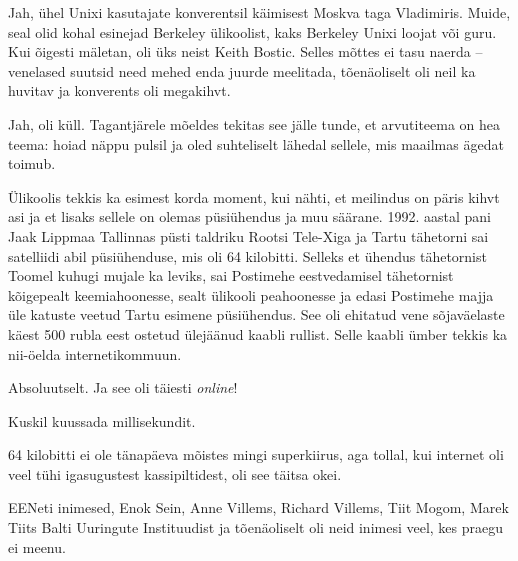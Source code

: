 
Jah, ühel Unixi kasutajate konverentsil käimisest Moskva taga Vladimiris. Muide, seal olid kohal esinejad Berkeley ülikoolist, 
kaks Berkeley Unixi loojat või guru. Kui õigesti mäletan, oli üks neist 
Keith Bostic. Selles mõttes ei tasu naerda -- venelased suutsid need mehed 
enda juurde meelitada, tõenäoliselt oli neil ka huvitav ja konverents oli 
megakihvt.


Jah, oli küll. Tagantjärele mõeldes tekitas see jälle tunde, et arvutiteema on hea 
teema: hoiad näppu pulsil ja oled suhteliselt lähedal sellele, mis 
maailmas ägedat toimub.

Ülikoolis tekkis ka esimest korda moment, kui nähti, et meilindus on päris 
kihvt asi ja et lisaks sellele on olemas püsiühendus ja muu säärane. 1992. 
aastal pani Jaak Lippmaa 
Tallinnas püsti taldriku Rootsi Tele-Xiga ja Tartu tähetorni sai satelliidi abil püsiühenduse, mis oli 64 kilobitti. Selleks et 
ühendus tähetornist Toomel kuhugi mujale ka leviks, sai Postimehe 
eestvedamisel tähetornist kõigepealt keemiahoonesse, sealt ülikooli peahoonesse ja edasi Postimehe majja 
üle katuste veetud Tartu esimene püsiühendus. See oli ehitatud vene 
sõjaväelaste käest 500 rubla eest ostetud ülejäänud kaabli rullist.
Selle kaabli ümber tekkis ka nii-öelda internetikommuun. 


Absoluutselt. Ja see oli täiesti \emph{online}!


Kuskil kuussada millisekundit.


64 kilobitti ei ole tänapäeva mõistes mingi superkiirus, aga 
tollal, kui internet oli veel tühi igasugustest kassipiltidest, oli see 
täitsa okei.


EENeti inimesed, Enok Sein, 
Anne Villems, Richard Villems, 
Tiit Mogom, Marek Tiits Balti Uuringute Instituudist ja tõenäoliselt oli neid inimesi 
veel, kes praegu ei meenu.

